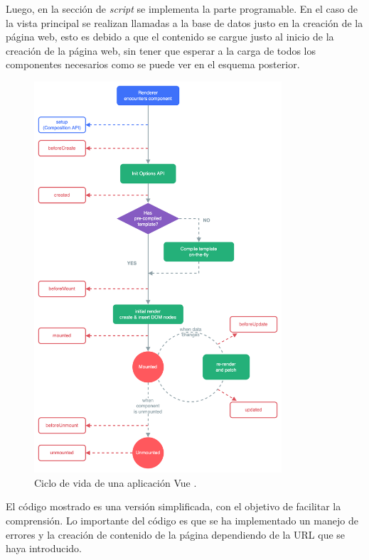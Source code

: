 \vspace{0.3cm}

Luego, en la sección de \textit{script} se implementa la parte programable. En el caso de la vista principal se realizan llamadas a la base de datos justo en la creación de la página web, esto es debido a que el contenido se cargue justo al inicio de la creación de la página web, sin tener que esperar a la carga de todos los componentes necesarios como se puede ver en el esquema posterior.

\begin{figure}[H]
    \centering
    \myfloatalign
    \includegraphics[width=0.82\textwidth]{gfx/lifecyclevue.png}
    \caption[Ciclo de vida de una aplicación Vue]{Ciclo de vida de una aplicación Vue \cite{vue-life}.}\label{gfx:lifecyclevue}
\end{figure}

El código mostrado es una versión simplificada, con el objetivo de facilitar la comprensión. Lo importante del código es que se ha implementado un manejo de errores y la creación de contenido de la página dependiendo de la URL que se haya introducido.

